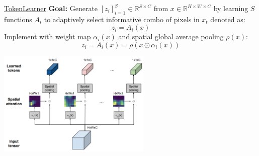 \documentclass{beamer}
\begin{document}
\begin{frame}[t]{ \href{https://arxiv.org/pdf/2106.11297}{TokenLearner}}
    \vspace{-0.5em}
    \textbf{Goal:} Generate $\left[z_i\right]^S_{i=1} \in \mathbb{R}^{S \times C}$ from $x \in \mathbb{R}^{H \times W \times C}$
    by learning $S$ functions $A_i$ to adaptively select informative combo of pixels in $x_t$ denoted as:
    \[z_i = A_i(x)\]
    Implement with weight map $\alpha_i(x)$ and spatial global average pooling $\rho(x)$:
    \[z_i = A_i(x) = \rho(x \odot \alpha_i(x))\]
    \begin{center}
        \includegraphics[width=0.55\textwidth]{./img/tokenlearner.png}
    \end{center}
\end{frame}
\end{document}
